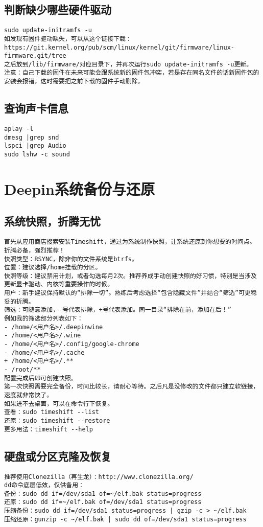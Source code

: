 \documentclass[a4paper,fontset=fandol,zihao=-4,linespread=1.2,oneside]{ctexbook}
\begin{document}
\section{判断缺少哪些硬件驱动}
\begin{lstlisting}
sudo update-initramfs -u
如发现有固件驱动缺失，可以从这个链接下载：
https://git.kernel.org/pub/scm/linux/kernel/git/firmware/linux-firmware.git/tree
之后放到/lib/firmware/对应目录下，并再次运行sudo update-initramfs -u更新。
注意：自己下载的固件在未来可能会跟系统新的固件包冲突，若是存在同名文件的话新固件包的安装会报错，这时需要把之前下载的固件手动删除。
\end{lstlisting}

\section{查询声卡信息}
\begin{lstlisting}
aplay -l
dmesg |grep snd
lspci |grep Audio
sudo lshw -c sound
\end{lstlisting}


\chapter{Deepin系统备份与还原}

\section{系统快照，折腾无忧}
\begin{lstlisting}
首先从应用商店搜索安装Timeshift，通过为系统制作快照，让系统还原到你想要的时间点。折腾必备，强烈推荐！
快照类型：RSYNC，除非你的文件系统是btrfs。
位置：建议选择/home挂载的分区。
快照等级：建议禁用计划，或者勾选每月2次。推荐养成手动创建快照的好习惯，特别是当涉及更新显卡驱动、内核等重要操作的时候。
用户：新手建议保持默认的“排除一切”。熟练后考虑选择“包含隐藏文件”并结合“筛选”可更稳妥的折腾。
筛选：可随意添加，-号代表排除，+号代表添加。同一目录“排除在前，添加在后！”
例如我的筛选部分列表如下：
- /home/<用户名>/.deepinwine
- /home/<用户名>/.wine
- /home/<用户名>/.config/google-chrome
- /home/<用户名>/.cache
+ /home/<用户名>/.**
- /root/**
配置完成后即可创建快照。
第一次快照需要完全备份，时间比较长，请耐心等待。之后凡是没修改的文件都只建立软链接，速度就非常快了。
如果进不去桌面，可以在命令行下恢复。
查看：sudo timeshift --list
还原：sudo timeshift --restore
更多用法：timeshift --help
\end{lstlisting}

\section{硬盘或分区克隆及恢复}
\begin{lstlisting}
推荐使用Clonezilla（再生龙）：http://www.clonezilla.org/
dd命令底层低效，仅供备用：
备份：sudo dd if=/dev/sda1 of=~/elf.bak status=progress
还原：sudo dd if=~/elf.bak of=/dev/sda1 status=progress
压缩备份：sudo dd if=/dev/sda1 status=progress | gzip -c > ~/elf.bak
压缩还原：gunzip -c ~/elf.bak | sudo dd of=/dev/sda1 status=progress
\end{lstlisting}
\end{document}
